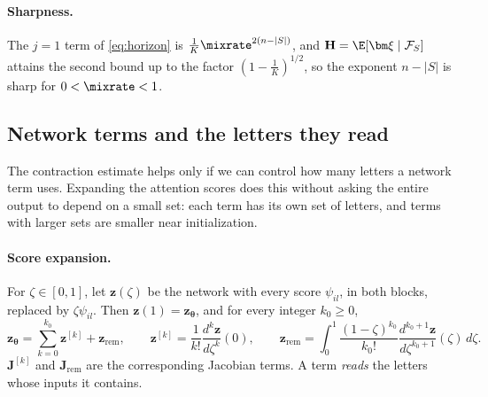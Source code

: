 \paragraph{Sharpness.}\label{rem:tight} The $j=1$ term of \cref{eq:horizon} is $\frac{1}{K}\mixrate^{2(n-|S|)}$, and $\mathbf H=\E[\bm\xi\mid\mathcal F_S]$ attains the second bound up to the
factor $(1-\frac{1}{K})^{1/2}$, so the exponent $n-|S|$ is sharp for $0<\mixrate<1$.

\subsection{Network terms and the letters they read}
\label{app:model-spectrum}

The contraction estimate helps only if we can control how many letters a network term uses. Expanding the attention scores does
this without asking the entire output to depend on a small set: each term has its own set of letters, and terms with larger sets
are smaller near initialization.

\paragraph{Score expansion.} For $\zeta\in[0,1]$, let $\bm z(\zeta)$ be the network with every score $\psi_{il}$, in both blocks, replaced by
$\zeta\psi_{il}$. Then $\bm z(1)=\bm z_{\bm\theta}$, and for every integer $k_0\ge0$,
\begin{equation}
 \bm z_{\bm\theta}=\sum_{k=0}^{k_0}\bm z^{[k]}+\bm z_{\mathrm{rem}},\qquad
 \bm z^{[k]}=\frac{1}{k!}\frac{d^k\bm z}{d\zeta^k}(0),\qquad
 \bm z_{\mathrm{rem}}=\int_0^1\frac{(1-\zeta)^{k_0}}{k_0!}\frac{d^{k_0+1}\bm z}{d\zeta^{k_0+1}}(\zeta)\,d\zeta .
 \label{eq:score-split}
\end{equation}
$\mathbf J^{[k]}$ and $\mathbf J_{\mathrm{rem}}$ are the corresponding Jacobian terms. A term \emph{reads} the letters whose inputs it contains.

